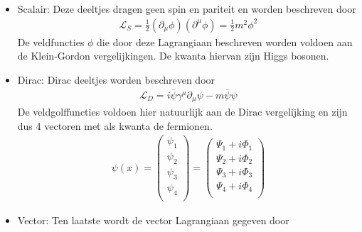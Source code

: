 \documentclass[../main.tex]{subfiles}
\begin{document}
\begin{itemize}
    \item Scalair: Deze deeltjes dragen geen spin en pariteit en worden beschreven door
        \begin{equation}
            \begin{aligned}
                \label{eq:lagr_scalair}
                \mathcal{L}_S = \frac{1}{2} (\partial_\mu \phi)(\partial^\mu \phi) = \frac{1}{2} m^2\phi^2
            \end{aligned}
        \end{equation}
        De veldfuncties $\phi$ die door deze Lagrangiaan beschreven worden voldoen aan de Klein-Gordon vergelijkingen. De kwanta hiervan zijn Higgs bosonen.
    \item Dirac: Dirac deeltjes worden beschreven door
        \begin{equation}
            \begin{aligned}
                \label{eq:lagr_dirac}
                \mathcal{L}_D = i\overline \psi \gamma^\mu \partial_\mu \psi - m \overline \psi\psi
            \end{aligned}
        \end{equation}
        De veldgolffuncties voldoen hier natuurlijk aan de Dirac vergelijking en zijn dus 4 vectoren met als kwanta de fermionen.
        \begin{equation}
            \begin{aligned}
                \label{eq:veld_func_dirac}
                \psi(x) =
                \begin{pmatrix}
                    \psi_1\\
                    \psi_2\\
                    \psi_3\\
                    \psi_4\\
                \end{pmatrix}=
                \begin{pmatrix}
                    \Psi_1 + i\Phi_1\\
                    \Psi_2 + i\Phi_2\\
                    \Psi_3 + i\Phi_3\\
                    \Psi_4 + i\Phi_4\\
                \end{pmatrix}
            \end{aligned}
        \end{equation}
    \item Vector: Ten laatste wordt de vector Lagrangiaan gegeven door

\end{itemize}
\end{document}
